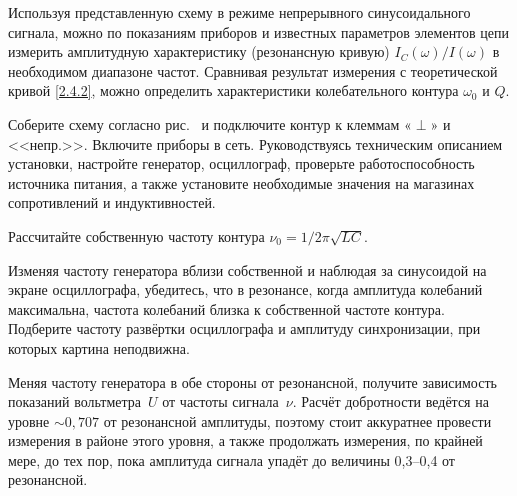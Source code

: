 Используя представленную схему в режиме непрерывного синусоидального 
сигнала, можно по показаниям приборов и известных параметров элементов 
цепи измерить амплитудную характеристику (резонансную кривую) 
$I_C(\omega)/I(\omega)$ в необходимом диапазоне частот. 
Сравнивая результат измерения с теоретической кривой \eqref{2.4.2}, можно 
определить характеристики колебательного контура $\omega_0$ и $Q$.
 
\begin{lab:task}

    

	\item Соберите схему согласно рис.~
	и подключите контур к клеммам «$\perp$» и <<непр.>>. Включите приборы в сеть. 
    Руководствуясь техническим описанием установки, настройте генератор, 
    осциллограф, проверьте работоспособность источника питания, 
    а также установите необходимые значения на магазинах сопротивлений 
    и индуктивностей.


	\item Рассчитайте собственную частоту контура $\nu_{0} = 1/2\pi\sqrt{LC}$.

	\item Изменяя частоту генератора вблизи собственной и наблюдая за синусоидой 
    на экране осциллографа, убедитесь, что в резонансе, когда амплитуда колебаний 
    максимальна, частота колебаний близка к собственной частоте контура. 
    Подберите частоту развёртки осциллографа и амплитуду синхронизации, 
    при которых картина неподвижна.

	\item Меняя частоту генератора в обе стороны от резонансной, получите зависимость 
    показаний вольтметра~$U$ от частоты сигнала~$\nu$. 
    Расчёт добротности ведётся на уровне $\sim 0,707$ от резонансной амплитуды, 
    поэтому стоит аккуратнее провести измерения в районе этого уровня, 
    а также продолжать измерения, по крайней мере, до тех пор, пока амплитуда 
    сигнала упадёт до величины 0,3--0,4 от резонансной.


\end{lab:task}
